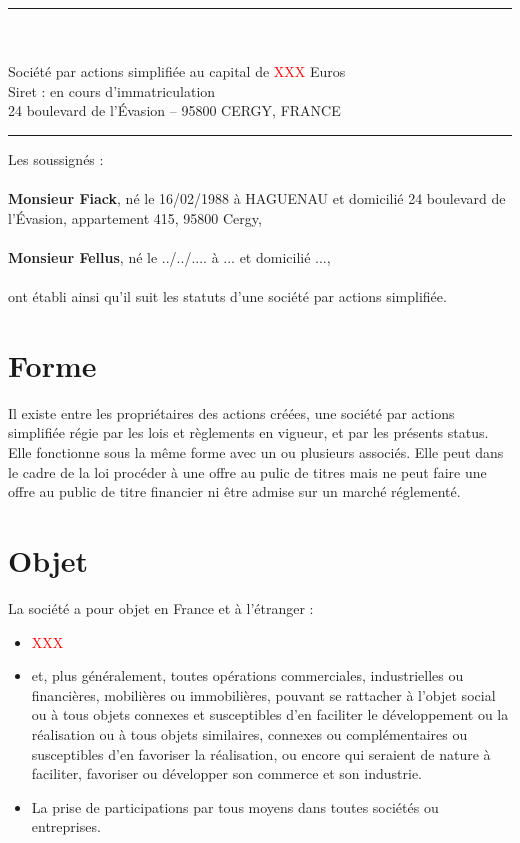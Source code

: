 \documentclass[a4paper,12pt]{report}
\newcommand{\address}{24 boulevard de l'Évasion -- 95800 CERGY, FRANCE}
\begin{document}


\begin{center}
	\begin{minipage}{0.8\linewidth}
		\center
		\rule{\linewidth}{0.5mm}\\
		\large{}\\
		\normalsize
		Société par actions simplifiée au capital de \textcolor{red}{XXX} Euros\\
		Siret : en cours d'immatriculation\\
		\normalsize{\address}\\
		\rule{\linewidth}{0.5mm}
	\end{minipage}
\end{center}
\vspace{5mm}
\noindent Les soussignés :\\\\
\textbf{Monsieur Fiack}, né le 16/02/1988 à HAGUENAU et domicilié 24 boulevard de l'Évasion, appartement 415, 95800 Cergy,\\\\
\textbf{Monsieur Fellus}, né le ../../.... à ... et domicilié ...,\\\\
ont établi ainsi qu'il suit les statuts d'une société par actions simplifiée.

\section{Forme}
Il existe entre les propriétaires des actions créées, une société par actions simplifiée régie par les lois et règlements en vigueur, et par les présents status.
Elle fonctionne sous la même forme avec un ou plusieurs associés.
Elle peut dans le cadre de la loi procéder à une offre au pulic de titres mais ne peut faire une offre au public de titre financier ni être admise sur un marché réglementé.

\section{Objet}
La société a pour objet en France et à l'étranger :
\begin{itemize}
	\item \textcolor{red}{XXX}
	\item et, plus généralement, toutes opérations commerciales, industrielles ou financières, mobilières ou immobilières,
		pouvant se rattacher à l'objet social ou à tous objets connexes et susceptibles d'en faciliter le développement ou la réalisation ou à tous objets similaires, 
		connexes ou complémentaires ou susceptibles d'en favoriser la réalisation, ou encore qui seraient de nature à faciliter, favoriser ou développer son commerce et son industrie.
	\item La prise de participations par tous moyens dans toutes sociétés ou entreprises.
\end{itemize}
\end{document}
